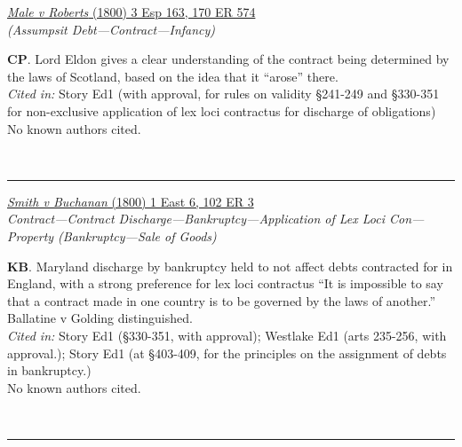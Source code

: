\documentclass[twoside]{article}
\begin{document}
        \begin{small}
        \begin{center}
        \href{https://heinonline.org/HOL/P?h=hein.engrep/engrk0170&i=578}{\textit{Male v Roberts} (1800) 3 Esp 163, 170 ER 574} \label{9} \\ 
\textit{ (Assumpsit Debt---Contract---Infancy)}\\
        \end{center}
        \textbf{CP}. Lord Eldon gives a clear understanding of the contract being determined by the laws of Scotland, based on the idea that it “arose” there.\\\textit{Cited in: }Story Ed1 (with approval, for rules on validity §241-249 and §330-351 for non-exclusive application of lex loci contractus for discharge of obligations)\\No known authors cited.
        \end{small}\\
        \rule{\textwidth}{0.5pt}
        

        \begin{small}
        \begin{center}
        \href{https://heinonline.org/HOL/P?h=hein.engrep/engrf0102&i=7}{\textit{Smith v Buchanan} (1800) 1 East 6, 102 ER 3} \label{41} \\ 
\textit{Contract---Contract Discharge---Bankruptcy---Application of Lex Loci Con---Property (Bankruptcy---Sale of Goods)}\\
        \end{center}
        \textbf{KB}. Maryland discharge by bankruptcy held to not affect debts contracted for in England, with a strong preference for lex loci contractus “It is impossible to say that a contract made in one country is to be governed by the laws of another.” Ballatine v Golding distinguished.\\\textit{Cited in: }Story Ed1 (§330-351, with approval); Westlake Ed1 (arts 235-256, with approval.); Story Ed1 (at §403-409, for the principles on the assignment of debts in bankruptcy.)\\No known authors cited.
        \end{small}\\
        \rule{\textwidth}{0.5pt}
        
\end{document}
